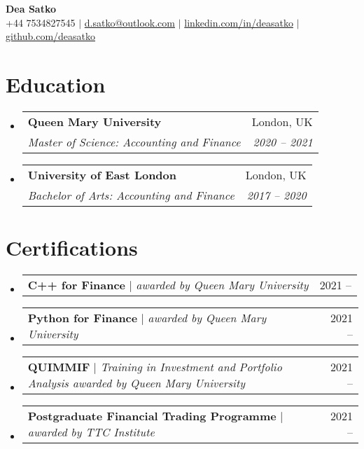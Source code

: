 \documentclass[letterpaper,11pt]{article}
\makeatletter
\newcommand{\resumeSubheading}[4]{
  \vspace{-2pt}\item
    \begin{tabular*}{0.97\textwidth}[t]{l@{\extracolsep{\fill}}r}
      \textbf{#1} & #2 \\
      \textit{\small#3} & \textit{\small #4} \\
    \end{tabular*}\vspace{-7pt}
}
\newcommand{\resumeProjectHeading}[2]{
    \item
    \begin{tabular*}{0.97\textwidth}{l@{\extracolsep{\fill}}r}
      \small#1 & #2 \\
    \end{tabular*}\vspace{-7pt}
}
\newcommand{\resumeSubHeadingListStart}{\begin{itemize}[leftmargin=0.15in, label={}]}
\newcommand{\resumeSubHeadingListEnd}{\end{itemize}}
\makeatother
\begin{document}

\begin{center}
    \textbf{\Huge Dea Satko} \\ \vspace{1pt}
    \small +44 7534827545 $|$ \href{mailto:d.satko@outlook.com}{{d.satko@outlook.com}} $|$ 
    \href{https://www.linkedin.com/in/deasatko/}{{linkedin.com/in/deasatko}} $|$
    \href{https://github.com/deasatko/}{{github.com/deasatko}}
\end{center}


\section{Education}
  \resumeSubHeadingListStart
    \resumeSubheading
      {Queen Mary University}{London, UK}
      {Master of Science: Accounting and Finance}{2020 -- 2021}
    \resumeSubheading
      {University of East London}{London, UK}
      {Bachelor of Arts: Accounting and Finance}{2017 -- 2020}
  \resumeSubHeadingListEnd

\section{Certifications}
  \resumeSubHeadingListStart
    \resumeProjectHeading
      {\textbf{C++ for Finance} $|$ \emph{awarded by Queen Mary University}}{2021 --}
    \resumeProjectHeading
      {\textbf{Python for Finance} $|$ \emph{awarded by Queen Mary University}}{2021 --}
    \resumeProjectHeading
      {\textbf{QUIMMIF} $|$ \emph{Training in Investment and Portfolio Analysis awarded by Queen Mary University}}{2021 --}
    \resumeProjectHeading
      {\textbf{Postgraduate Financial Trading Programme} $|$ \emph{awarded by TTC Institute}}{2021 --}
\resumeSubHeadingListEnd

\end{document}
